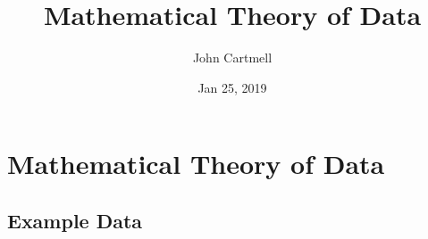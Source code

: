 

\usepackage{mathptmx}
\usepackage{amsfonts}
\usepackage{wasysym}
\usepackage{url}
\usepackage{hyperref}

\newcommand{\sharedmacros}{../../SharedMacros}









\renewcommand{\erpictureFolder}[0]{../../SharedPictures}
\setcounter{equation}{0}



\title[John Cartmell]{Mathematical Theory of Data}
\author{John Cartmell}
\date{Jan 25, 2019}

\usepackage{framed}
\usepackage{bibentry}
\usepackage{colortbl}

\nobibliography*



\begin{frame}
\titlepage
\end{frame}

\iffalse
\begin{frame}{Test}
\begin{description}	[longest label] 
\item<1->[short] Some text. 
\item<2->[longest label] Some text. 
\item<3->[long label] Some text. 
\end{description}
\end{frame}
\fi

\section{Mathematical Theory of Data}

\subsection{Example Data}


